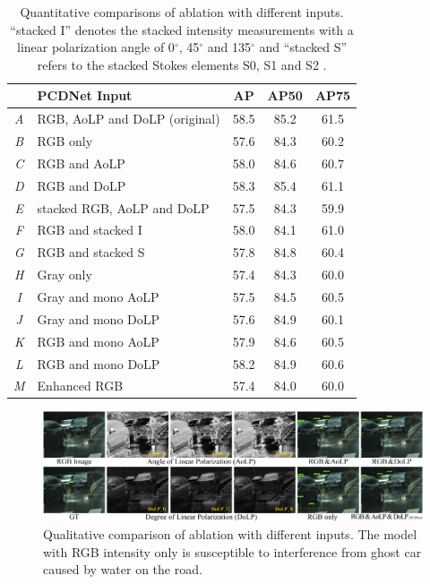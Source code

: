 \begin{table}[t]
\small
\centering
\caption{Quantitative comparisons of ablation with different inputs. ``stacked I'' denotes the stacked intensity measurements with a linear polarization angle of 0$^{\circ}$, 45$^{\circ}$ and 135$^{\circ}$ and ``stacked S'' refers to the stacked Stokes elements S0, S1 and S2 \cite{blin2019road}.}
\begin{tabular}{clccc}
\hline\hline
	&	PCDNet Input	&	AP	&	AP50	&	AP75	\\
 \hline
\textit{A}	&	RGB, AoLP and DoLP (original)	&	58.5 	&	85.2 	&	61.5 	\\
\hline
\textit{B}	&	RGB only	&	57.6 	&	84.3 	&	60.2 	\\
\textit{C}	&	RGB and AoLP	&	58.0 	&	84.6 	&	60.7 	\\
\textit{D}	&	RGB and DoLP	&	58.3 	&	85.4 	&	61.1 	\\
\textit{E}	&	stacked RGB, AoLP and DoLP	&	57.5 	&	84.3 	&	59.9 	\\
\textit{F}	&	RGB and stacked I	&	58.0 	&	84.1 	&	61.0 	\\
\textit{G}	&	RGB and stacked S	&	57.8 	&	84.8 	&	60.4 	\\
\textit{H}	&	Gray only	&	57.4 	&	84.3 	&	60.0 	\\
\textit{I}  &   Gray and mono AoLP & 57.5 & 84.5 & 60.5 \\
\textit{J}  &   Gray and mono DoLP & 57.6 & 84.9 & 60.1 \\
\textit{K}	&	RGB and mono AoLP	&	57.9 	&	84.6 	&	60.5 	\\
\textit{L}	&	RGB and mono DoLP	&	58.2 	&	84.9 	&	60.6 	\\
\textit{M}  &   Enhanced RGB & 57.4 & 84.0 & 60.0 \\
\hline\hline
\end{tabular}
\label{tab:abl_input}
\end{table}

\begin{figure}[t]
    \centering
    \includegraphics[width=1\linewidth]{figure/abl_input.pdf}
    \caption{Qualitative comparison of ablation with different inputs. The model with RGB intensity only is susceptible to interference from ghost car caused by water on the road.}
    \label{fig:abl_input}
\end{figure}

